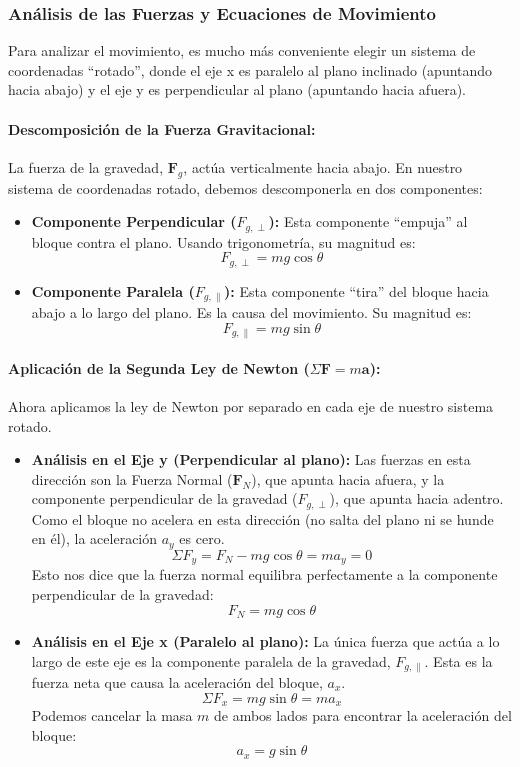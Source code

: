 \documentclass[11pt,a4paper]{book}
\begin{document}
\subsubsection{Análisis de las Fuerzas y Ecuaciones de Movimiento}

Para analizar el movimiento, es mucho más conveniente elegir un sistema de coordenadas ``rotado'', donde el eje x es paralelo al plano inclinado (apuntando hacia abajo) y el eje y es perpendicular al plano (apuntando hacia afuera).

\paragraph{Descomposición de la Fuerza Gravitacional:}
La fuerza de la gravedad, $\boldsymbol{F}_g$, actúa verticalmente hacia abajo. En nuestro sistema de coordenadas rotado, debemos descomponerla en dos componentes:
\begin{itemize}
    \item \textbf{Componente Perpendicular ($F_{g, \perp}$):} Esta componente ``empuja'' al bloque contra el plano. Usando trigonometría, su magnitud es:
    \[ F_{g, \perp} = mg \cos\theta \]
    \item \textbf{Componente Paralela ($F_{g, \parallel}$):} Esta componente ``tira'' del bloque hacia abajo a lo largo del plano. Es la causa del movimiento. Su magnitud es:
    \[ F_{g, \parallel} = mg \sin\theta \]
\end{itemize}

\paragraph{Aplicación de la Segunda Ley de Newton ($\Sigma \boldsymbol{F} = m\boldsymbol{a}$):}
Ahora aplicamos la ley de Newton por separado en cada eje de nuestro sistema rotado.

\begin{itemize}
    \item \textbf{Análisis en el Eje y (Perpendicular al plano):}
    Las fuerzas en esta dirección son la Fuerza Normal ($\boldsymbol{F}_N$), que apunta hacia afuera, y la componente perpendicular de la gravedad ($F_{g, \perp}$), que apunta hacia adentro. Como el bloque no acelera en esta dirección (no salta del plano ni se hunde en él), la aceleración $a_y$ es cero.
    \[ \Sigma F_y = F_N - mg \cos\theta = m a_y = 0 \]
    Esto nos dice que la fuerza normal equilibra perfectamente a la componente perpendicular de la gravedad:
    \[ F_N = mg \cos\theta \]

    \item \textbf{Análisis en el Eje x (Paralelo al plano):}
    La única fuerza que actúa a lo largo de este eje es la componente paralela de la gravedad, $F_{g, \parallel}$. Esta es la fuerza neta que causa la aceleración del bloque, $a_x$.
    \[ \Sigma F_x = mg \sin\theta = m a_x \]
    Podemos cancelar la masa $m$ de ambos lados para encontrar la aceleración del bloque:
    \[ \boxed{a_x = g \sin\theta} \]
\end{itemize}
\end{document}
